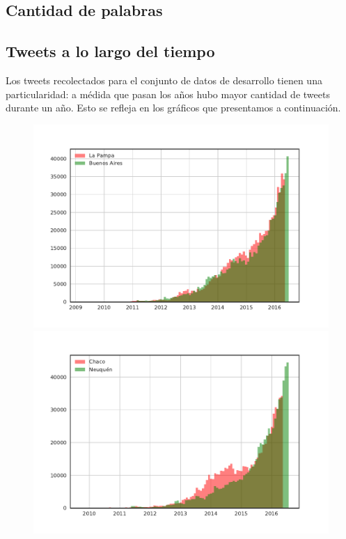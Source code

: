 \subsection{Cantidad de palabras}
\subsection{Tweets a lo largo del tiempo}
Los tweets recolectados para el conjunto de datos de desarrollo tienen una particularidad: a médida que pasan los años 
hubo mayor cantidad de tweets durante un año. Esto se refleja en los gráficos que presentamos a continuación.

\begin{figure}[!ht]\centering
   \begin{minipage}{0.49\textwidth}
     \includegraphics[width=\linewidth]{./images/histTweetsProvincia1.pdf}
     \caption{}
     \label{fig:histTweetsProvincia1}
   \end{minipage}
   \begin {minipage}{0.49\textwidth}
     \includegraphics[width=\linewidth]{./images/histTweetsProvincia2.pdf}

\end{minipage}
\end{figure}
